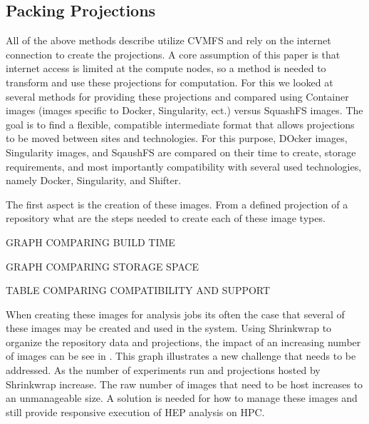 \documentclass[conference]{IEEEtran}
\begin{document}
\subsection{Packing Projections}

All of the above methods describe utilize CVMFS
and rely on the internet connection to create
the projections.
A core assumption of this paper is that internet
access is limited at the compute nodes, so a method
is needed to transform and use these projections
for computation.
For this we looked at several methods for providing
these projections and compared using 
Container images (images specific to Docker, Singularity, ect.)
versus SquashFS images.
The goal is to find a flexible, compatible intermediate
format that allows projections to be moved between sites
and technologies.
For this purpose, DOcker images, Singularity images, and 
SqaushFS are compared on their time to create,
storage requirements, and most importantly compatibility
with several used technologies, namely 
Docker, Singularity, and Shifter.

The first aspect is the creation of these images.
From a defined projection of a repository
what are the steps needed to create each of these image types.

GRAPH COMPARING BUILD TIME

GRAPH COMPARING STORAGE SPACE

TABLE COMPARING COMPATIBILITY AND SUPPORT



When creating these images for analysis jobs its often the case that several
of these images may be created and used in the system.
Using Shrinkwrap to organize the repository data and projections,
the impact of an increasing number of images can be see in 
.
This graph illustrates a new challenge that needs to be addressed.
As the number of experiments run and projections hosted by Shrinkwrap
increase. 
The raw number of images that need to be host increases to an unmanageable
size.
A solution is needed for how to manage these images and still
provide responsive execution of HEP analysis on HPC.
\end{document}
